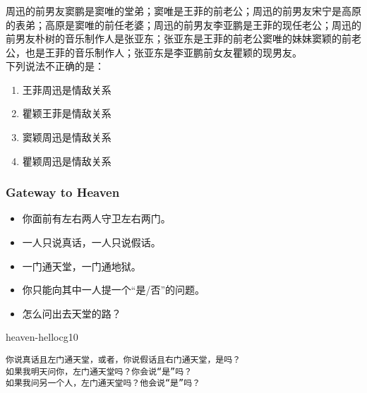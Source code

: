\documentclass[UTF8,11pt,colorlinks,compress,openany]{beamer}%
\begin{document}
\begin{frame}\frametitle{}
\begin{problem}
周迅的前男友窦鹏是窦唯的堂弟；窦唯是王菲的前老公；周迅的前男友宋宁是高原的表弟；高原是窦唯的前任老婆；周迅的前男友李亚鹏是王菲的现任老公；周迅的前男友朴树的音乐制作人是张亚东；张亚东是王菲的前老公窦唯的妹妹窦颖的前老公，也是王菲的音乐制作人；张亚东是李亚鹏前女友瞿颖的现男友。\\
下列说法不正确的是：
\begin{enumerate}
\item 王菲周迅是情敌关系
\item 瞿颖王菲是情敌关系
\item 窦颖周迅是情敌关系
\item 瞿颖周迅是情敌关系
\end{enumerate}
\end{problem}
\end{frame}

\begin{frame}[fragile]\frametitle{Gateway to Heaven}
	\begin{problem}
		\begin{itemize}
			\item 你面前有左右两人守卫左右两门。
			\item 一人只说真话，一人只说假话。
			\item 一门通天堂，一门通地狱。
			\item 你只能向其中一人提一个“是/否”的问题。
			\item 怎么问出去天堂的路？
		\end{itemize}
	\end{problem}
\begin{ocg}{heaven-hell}{ocg1}{0}
\begin{verbatim}
你说真话且左门通天堂，或者，你说假话且右门通天堂，是吗？
如果我明天问你，左门通天堂吗？你会说“是”吗？
如果我问另一个人，左门通天堂吗？他会说“是”吗？
\end{verbatim}
\end{ocg}
\end{frame}
\end{document}
